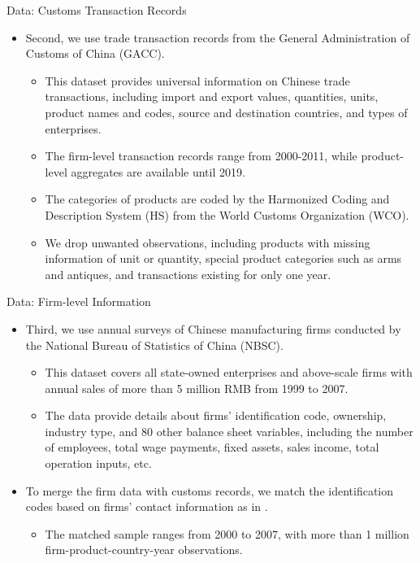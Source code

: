 \documentclass[10pt]{beamer}
\begin{document}
\begin{frame}{Data: Customs Transaction Records}
	\begin{itemize}
		\item Second, we use trade transaction records from the General Administration of Customs of China (GACC).
		\begin{itemize}
			\item This dataset provides universal information on Chinese trade transactions, including import and export values, quantities, units, product names and codes, source and destination countries, and types of enterprises.
                \item The firm-level transaction records range from 2000-2011, while product-level aggregates are available until 2019.
                \item The categories of products are coded by the Harmonized Coding and Description System (HS) from the World Customs Organization (WCO).
                \item We drop unwanted observations, including products with missing information of unit or quantity, special product categories such as arms and antiques, and transactions existing for only one year.
		\end{itemize}		
	\end{itemize}
\end{frame}

\begin{frame}{Data: Firm-level Information}
	\begin{itemize}
		\item Third, we use annual surveys of Chinese manufacturing firms conducted by the National Bureau of Statistics of China (NBSC).
		\begin{itemize}
			\item This dataset covers all state-owned enterprises and above-scale firms with annual sales of more than 5 million RMB from 1999 to 2007.
			\item The data provide details about firms’ identification code, ownership, industry type, and 80 other balance sheet variables, including the number of employees, total wage payments, fixed assets, sales income, total operation inputs, etc.
		\end{itemize}
		\item To merge the firm data with customs records, we match the identification codes based on firms' contact information as in \cite{fan-li-yeaple2015}.
            \begin{itemize}
                \item The matched sample ranges from 2000 to 2007, with more than 1 million firm-product-country-year observations.
            \end{itemize}
	\end{itemize}
\end{frame}
\end{document}
